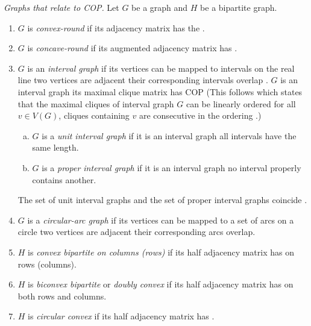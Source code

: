 \begin{definition}{\emph{Graphs that relate to
      COP.\cite[Def.~2.5]{d08phd}}} %
  \label{def:graphwithcop} %
  Let $G$ be a graph and $H$ be a bipartite graph.
  \begin{enumerate}
  \item $G$ is \emph{convex-round} if its adjacency matrix has the
    \CROP.
  \item \label{def::concave-round} $G$ is \emph{concave-round} if its
    augmented adjacency matrix has \CROP. \cite{bhy00}
  \item $G$ is an \emph{interval graph} if its vertices can be mapped
    to intervals on the real line \stt two vertices are adjacent \iff
    their corresponding intervals overlap \cite{sb59}.  $G$ is an interval graph \iff its maximal clique matrix
    has COP \cite{fg65} (This follows \cite{gh64} which states
      that the maximal cliques of interval graph $G$ can be linearly
      ordered \stt for all $v \in V(G)$, cliques containing $v$ are
      consecutive in the ordering \cite[Th. 8.1]{mcg04}.)
    \begin{enumerate}[a.]
    \item $G$ is a \emph{unit interval graph} if it is an interval
      graph \stt all intervals have the same length.
    \item $G$ is a \emph{proper interval graph} if it is an interval
      graph \stt no interval properly contains another.
    \end{enumerate}
    The set of unit interval graphs and the set of proper interval
    graphs coincide \cite{rob69, gar07}.
 \item $G$ is a \emph{circular-arc graph} if its vertices can be
    mapped to a set of arcs on a circle \stt two vertices are adjacent
    \iff their corresponding arcs overlap.
  \item $H$ is \emph{convex bipartite on columns (rows)} if its half
    adjacency matrix has \COP on rows (columns).%
    \label{def::convexbi}
  \item $H$ is \emph{biconvex bipartite} or \emph{doubly
      convex}\cite{yc95} if its half adjacency matrix has \COP on both
    rows and columns.
  \item $H$ is \emph{circular convex} if its half adjacency matrix has
    \CROP.
  \end{enumerate}
\end{definition}

